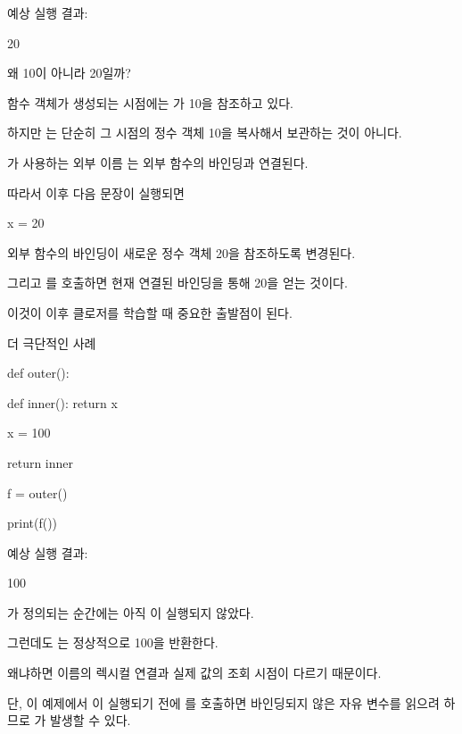 예상 실행 결과:

\begin{dhkzsh}
20
\end{dhkzsh}

왜 10이 아니라 20일까?

 함수 객체가 생성되는 시점에는 가 10을 참조하고 있다.

하지만 는 단순히 그 시점의 정수 객체 10을 복사해서 보관하는 것이 아니다.

가 사용하는 외부 이름 는 외부 함수의 바인딩과 연결된다.

따라서 이후 다음 문장이 실행되면

\begin{dhkcode}
x = 20
\end{dhkcode}

외부 함수의  바인딩이 새로운 정수 객체 20을 참조하도록 변경된다.

그리고 를 호출하면 현재 연결된 바인딩을 통해 20을 얻는 것이다.

이것이 이후 클로저를 학습할 때 중요한 출발점이 된다.

\begin{dhknote}
\begin{dhksmry}[centered]
더 극단적인 사례
\end{dhksmry}
\end{dhknote}

\begin{dhkcode}
def outer():

    def inner():
        return x

    x = 100

    return inner

f = outer()

print(f())
\end{dhkcode}

예상 실행 결과:

\begin{dhkzsh}
100
\end{dhkzsh}

가 정의되는 순간에는 아직 이 실행되지 않았다.

그런데도 는 정상적으로 100을 반환한다.

왜냐하면 이름의 렉시컬 연결과 실제 값의 조회 시점이 다르기 때문이다.

단, 이 예제에서 이 실행되기 전에 를 호출하면 바인딩되지 않은 자유 변수를 읽으려 하므로 가 발생할 수 있다.

